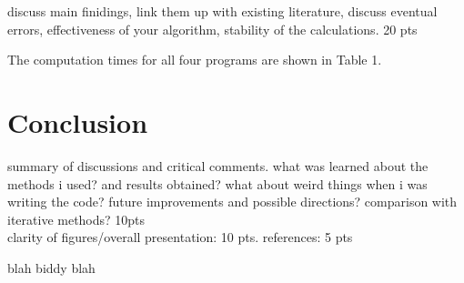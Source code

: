 \documentclass[prb,aps,twocolumn,showpacs,10pt]{revtex4-1}
\begin{document}
discuss main finidings, link them up with existing literature, discuss eventual errors, effectiveness of your algorithm, stability of the calculations. 20 pts

The computation times for all four programs are shown in Table 1. 

\section{Conclusion}
summary of discussions and critical comments. 
what was learned about the methods i used? and results obtained? 
what about weird things when i was writing the code?
future improvements and possible directions?
comparison with iterative methods?
10pts\\

clarity of figures/overall presentation: 10 pts.
references: 5 pts

\newpage
blah biddy blah
\end{document}
